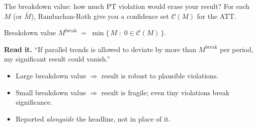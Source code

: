 \documentclass[aspectratio=169,11pt]{beamer}
\begin{document}
\begin{frame}{The breakdown value: how much PT violation would erase your result?}
\vspace{0.4em}
For each $M$ (or $\bar M$), Rambachan-Roth give you a confidence set $\mathcal{C}(M)$ for the ATT.
\vspace{0.5em}
\begin{block}{Breakdown value}
\centering
$M^{\text{break}} \;=\; \min\{\, M \;:\; 0 \in \mathcal{C}(M)\,\}.$
\end{block}
\vspace{0.5em}
\textbf{Read it.} \;``If parallel trends is allowed to deviate by more than $M^{\text{break}}$ per period, my significant result could vanish.''

\vspace{0.5em}
\begin{itemize}\small
  \item Large breakdown value $\Rightarrow$ result is robust to plausible violations.
  \item Small breakdown value $\Rightarrow$ result is fragile; even tiny violations break significance.
  \item Reported \textit{alongside} the headline, not in place of it.
\end{itemize}
\vspace{0.3em}
\end{frame}

\end{document}
